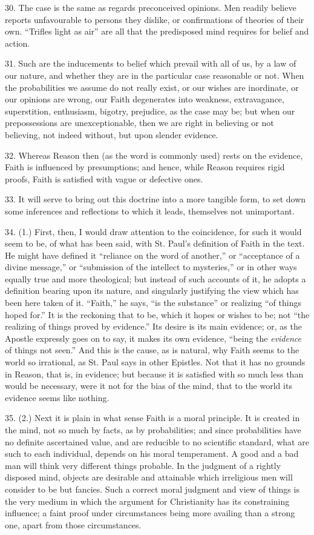 30. The case is the same as regards preconceived opinions. Men
readily believe reports unfavourable to persons they dislike, or
confirmations of theories of their own. ``Trifles light as
air'' are all that the predisposed mind requires for belief and
action.

31. Such are the inducements to belief which prevail with all of
us, by a law of our nature, and whether they are in the particular
case reasonable or not. When the probabilities we assume do not really
exist, or our wishes are inordinate, or our opinions are wrong, our
Faith degenerates into weakness, extravagance, superstition, enthusiasm, bigotry, prejudice, as the
case may be; but when our
prepossessions are unexceptionable, then we are right in believing or
not believing, not indeed without, but upon slender evidence.

32. Whereas Reason then (as the word is commonly used) rests on the
evidence, Faith is influenced by presumptions; and hence, while Reason
requires rigid proofs, Faith is satisfied with vague or defective
ones.

33. It will serve to bring out this doctrine into a more tangible
form, to set down some inferences and reflections to which it leads,
themselves not unimportant.

34. (1.) First, then, I would draw attention to the coincidence,
for such it would seem to be, of what has been said, with St. Paul's
definition of Faith in the text. He might have defined it
``reliance on the word of another,'' or ``acceptance of a
divine message,'' or ``submission of the intellect to
mysteries,'' or in other ways equally true and more theological;
but instead of such accounts of it, he adopts a definition bearing
upon its nature, and singularly justifying the view which has been
here taken of it. ``Faith,'' he says, ``is the
substance'' or realizing ``of things hoped for.'' It is
the reckoning that to be, which it hopes or wishes to be; not
``the realizing of things proved by evidence.'' Its desire is
its main evidence; or, as the Apostle expressly goes on to say, it
makes its own evidence, ``being the \emph{evidence} of things not
seen.'' And this is the cause, as is natural, why Faith seems to
the world so irrational, as St. Paul says in other Epistles. Not that
it has no grounds in Reason, that is, in evidence; but because it is
satisfied with so much less than would be necessary, were it not for
the bias of the mind, that to the world its evidence seems like
nothing.

35. (2.) Next it is plain in what sense Faith is a moral principle.
It is created in the mind, not so much by facts, as by probabilities;
and since probabilities have no definite ascertained value, and are
reducible to no scientific standard, what are such to each individual,
depends on his moral temperament. A good and a bad man will think very
different things probable. In the judgment of a rightly disposed mind,
objects are desirable and attainable which irreligious men will
consider to be but fancies. Such a correct moral judgment and view of
things is the very medium in which the argument for Christianity has
its constraining influence; a faint proof under circumstances being
more availing than a strong one, apart from those circumstances.

